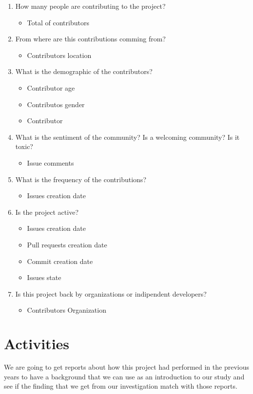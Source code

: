 \begin{enumerate}
    \item How many people are contributing to the project?
    \begin{itemize}
        \item Total of contributors
    \end{itemize}
    \item From where are this contributions comming from?
    \begin{itemize}
        \item Contributors location
    \end{itemize}
    \item What is the demographic of the contributors?
    \begin{itemize}
        \item Contributor age
        \item Contributos gender
        \item Contributor 
    \end{itemize}
    \item What is the sentiment of the community? Is a welcoming community? Is it toxic?
    \begin{itemize}
        \item Issue comments
    \end{itemize}
    \item What is the frequency of the contributions?
    \begin{itemize}
        \item Issues creation date
    \end{itemize}
    \item Is the project active?
    \begin{itemize}
        \item Issues creation date
        \item Pull requests creation date
        \item Commit creation date
        \item Issues state
    \end{itemize}
    \item Is this project back by organizations or indipendent developers?
    \begin{itemize}
        \item Contributors Organization
    \end{itemize}
\end{enumerate}

\pagebreak
\section{Activities}
We are going to get reports about how this project had performed in the previous years to have a background that we can use as an introduction to our study and see if the finding that we get from our investigation match with those reports.

